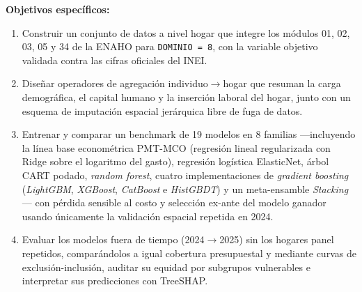 \textbf{Objetivos específicos:}
\begin{enumerate}
    \item Construir un conjunto de datos a nivel hogar que integre los módulos 01, 02, 03, 05 y 34 de la ENAHO para \texttt{DOMINIO = 8}, con la variable objetivo validada contra las cifras oficiales del INEI.
    \item Diseñar operadores de agregación individuo$\rightarrow$hogar que resuman la carga demográfica, el capital humano y la inserción laboral del hogar, junto con un esquema de imputación espacial jerárquica libre de fuga de datos.
    \item Entrenar y comparar un benchmark de 19 modelos en 8 familias ---incluyendo la línea base econométrica PMT-MCO (regresión lineal regularizada con Ridge sobre el logaritmo del gasto), regresión logística ElasticNet, árbol CART podado, \textit{random forest}, cuatro implementaciones de \textit{gradient boosting} (\textit{LightGBM}, \textit{XGBoost}, \textit{CatBoost} e \textit{HistGBDT}) y un meta-ensamble \textit{Stacking}--- con pérdida sensible al costo y selección ex-ante del modelo ganador usando únicamente la validación espacial repetida en 2024.
    \item Evaluar los modelos fuera de tiempo (2024$\rightarrow$2025) sin los hogares panel repetidos, comparándolos a igual cobertura presupuestal y mediante curvas de exclusión-inclusión, auditar su equidad por subgrupos vulnerables e interpretar sus predicciones con TreeSHAP.
\end{enumerate}

